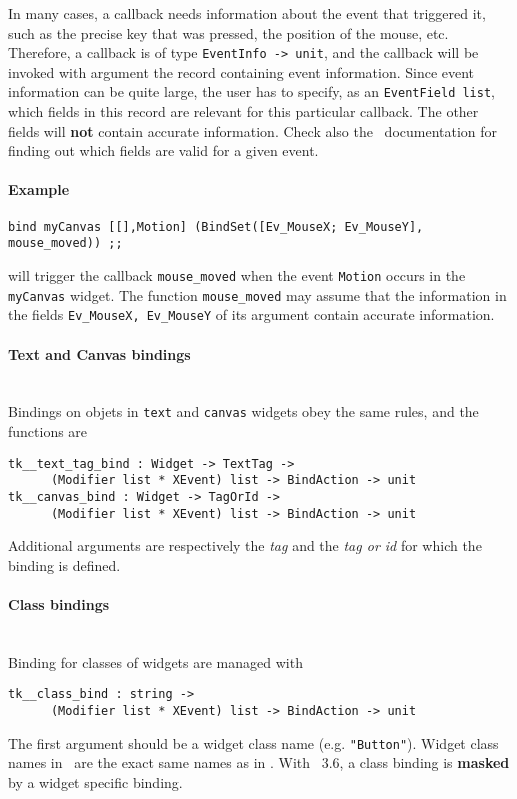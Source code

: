 In many cases, a callback needs information about the event that
triggered it, such as the precise key that was pressed, the position of the
mouse, etc. Therefore, a callback is of type \verb|EventInfo -> unit|, 
and the callback will be invoked with argument the record containing
event information. Since event information can be quite large,
the user has to specify, as an \verb|EventField list|, which fields in this
record are relevant for this particular callback. 
The other fields will {\bf not} contain accurate information. 
Check also the \tk\ documentation for finding out which fields are valid for a
given event.

\paragraph{Example}
\begin{verbatim}
bind myCanvas [[],Motion] (BindSet([Ev_MouseX; Ev_MouseY], mouse_moved)) ;;
\end{verbatim} 
will trigger the callback \verb|mouse_moved| when the event \verb|Motion|
occurs in the \verb|myCanvas| widget. The function \verb|mouse_moved| may
assume that the  information in the fields {\tt Ev\_MouseX, Ev\_MouseY} of
its argument contain accurate information.

\paragraph{Text and Canvas bindings}
\mbox{}\\

Bindings on objets in \verb|text| and \verb|canvas| widgets obey the same
rules, and the functions are 
\begin{verbatim}
tk__text_tag_bind : Widget -> TextTag -> 
      (Modifier list * XEvent) list -> BindAction -> unit
tk__canvas_bind : Widget -> TagOrId -> 
      (Modifier list * XEvent) list -> BindAction -> unit
\end{verbatim} 
Additional arguments are respectively the {\em tag} and the {\em tag or id}
for which the binding is defined.

\paragraph{Class bindings}
\mbox{}\\

Binding for classes of widgets are managed with
\begin{verbatim}
tk__class_bind : string -> 
      (Modifier list * XEvent) list -> BindAction -> unit
\end{verbatim} 
The first argument should be a widget class name (e.g. \verb|"Button"|).
Widget class names in \camltk\ are the exact same names as in \tk.
With \tk\ 3.6, a class binding is {\bf masked} by a widget specific binding.

